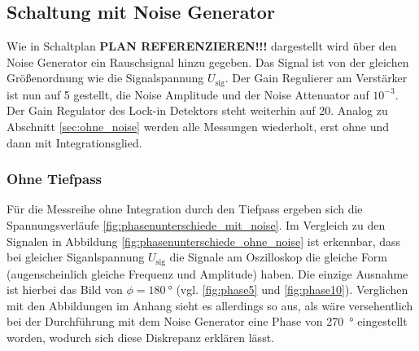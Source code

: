 \subsection{Schaltung mit Noise Generator}
\label{sec:mit_noise}
Wie in Schaltplan \textbf{PLAN REFERENZIEREN!!!} dargestellt wird über den Noise Generator ein Rauschsignal hinzu gegeben.
Das Signal ist von der gleichen Größenordnung wie die Signalspannung $U_\text{sig}$.
Der Gain Regulierer am Verstärker ist nun auf 5 gestellt, die Noise Amplitude und der Noise Attenuator auf $10^{-3}$.
Der Gain Regulator des Lock-in Detektors steht weiterhin auf 20.
Analog zu Abschnitt \ref{sec:ohne_noise} werden alle Messungen wiederholt, erst ohne und dann mit Integrationsglied.


\subsubsection{Ohne Tiefpass}
\label{sec:mit_noise_ohne_tp}
Für die Messreihe ohne Integration durch den Tiefpass ergeben sich die Spannungsverläufe \ref{fig:phasenunterschiede_mit_noise}.
Im Vergleich zu den Signalen in Abbildung \ref{fig:phasenunterschiede_ohne_noise} ist erkennbar, dass bei gleicher Siganlspannung $U_\text{sig}$
die Signale am Oszilloskop die gleiche Form (augenscheinlich gleiche Frequenz und Amplitude) haben.
Die einzige Ausnahme ist hierbei das Bild von $\phi = \qty[]{180}{\degree}$ (vgl. \ref{fig:phase5} und \ref{fig:phase10}).
Verglichen mit den Abbildungen im Anhang sieht es allerdings so aus, als wäre versehentlich bei der Durchführung mit dem Noise Generator eine Phase von 
\qty[]{270}{\degree} eingestellt worden, wodurch sich diese Diskrepanz erklären lässt.
%
%
